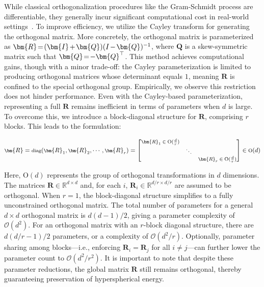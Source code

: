 While classical orthogonalization procedures like the Gram-Schmidt process are differentiable, they generally incur significant computational cost in real-world settings~\cite{liu2021orthogonal}. To improve efficiency, we utilize the Cayley transform for generating the orthogonal matrix. More concretely, the orthogonal matrix is parameterized as $\thickmuskip=2mu \medmuskip=2mu \bm{R}=(\bm{I}+\bm{Q})(I-\bm{Q})^{-1}$, where $\bm{Q}$ is a skew-symmetric matrix such that $\thickmuskip=2mu \medmuskip=2mu \bm{Q}=-\bm{Q}^\top$. This method achieves computational gains, though with a minor trade-off: the Cayley parameterization is limited to producing orthogonal matrices whose determinant equals $1$, meaning $\bm{R}$ is confined to the special orthogonal group. Empirically, we observe this restriction does not hinder performance. Even with the Cayley-based parameterization, representing a full $\bm{R}$ remains inefficient in terms of parameters when $d$ is large. To overcome this, we introduce a block-diagonal structure for $\bm{R}$, comprising $r$ blocks. This leads to the formulation:

\begin{equation}
    \footnotesize
    \bm{R}=\text{diag}(\bm{R}_1,\bm{R}_2,\cdots,\bm{R}_r)=\begin{bmatrix}
    \bm{R}_1\in \text{O}(\frac{d}{r}) &  &\\
    &\ddots & \\
    & & \bm{R}_r\in \text{O}(\frac{d}{r})
    \end{bmatrix}\in \text{O}(d)
\end{equation}

Here, $\text{O}(d)$ represents the group of orthogonal transformations in $d$ dimensions. The matrices $\bm{R}\in\mathbb{R}^{d\times d}$ and, for each $i$, $\bm{R}_i\in\mathbb{R}^{d/r\times d/r}$ are assumed to be orthogonal. When $r=1$, the block-diagonal structure simplifies to a fully unconstrained orthogonal matrix. The total number of parameters for a general $d\times d$ orthogonal matrix is $d(d-1)/2$, giving a parameter complexity of $\mathcal{O}(d^2)$. For an orthogonal matrix with an $r$-block diagonal structure, there are $d(d/r-1)/2$ parameters, or a complexity of $\mathcal{O}(d^2/r)$. Optionally, parameter sharing among blocks—i.e., enforcing $\bm{R}_i = \bm{R}_j$ for all $i\neq j$—can further lower the parameter count to $\mathcal{O}(d^2/r^2)$. It is important to note that despite these parameter reductions, the global matrix $\bm{R}$ still remains orthogonal, thereby guaranteeing preservation of hyperspherical energy.

